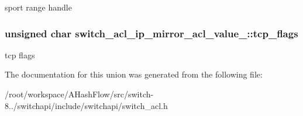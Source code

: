sport range handle \hypertarget{unionswitch__acl__ip__mirror__acl__value___a1e57ecd28ae076064b62cf57c4529c86}{
\subsubsection[{tcp\+\_\+flags}]{\setlength{\rightskip}{0pt plus 5cm}unsigned char switch\+\_\+acl\+\_\+ip\+\_\+mirror\+\_\+acl\+\_\+value\+\_\+\+::tcp\+\_\+flags}}\label{unionswitch__acl__ip__mirror__acl__value___a1e57ecd28ae076064b62cf57c4529c86}
tcp flags 

The documentation for this union was generated from the following file\+:\begin{DoxyCompactItemize}
\item 
/root/workspace/\+A\+Hash\+Flow/src/switch-\/8../switchapi/include/switchapi/switch\+\_\+acl.\+h\end{DoxyCompactItemize}
